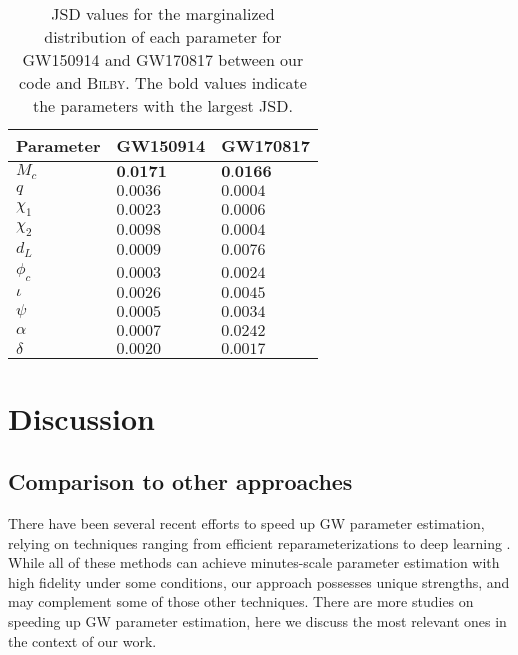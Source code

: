 \documentclass[twocolumn]{aastex631}
\begin{document}
\begin{table}[hbt!]
    \begin{center}
    \begin{tabular}{ l l l}
    \hline
    \hline
    Parameter & GW150914 & GW170817\\
    \hline
        $M_c$ & $\textbf{0.0171}$ & $\textbf{0.0166}$ \\
        $q$ & $0.0036$ & $0.0004$ \\
        $\chi_1$ & $0.0023$ & $0.0006$ \\
        $\chi_2$ & $0.0098$ & $0.0004$ \\
        $d_L$ & $0.0009$ & $0.0076$ \\
        $\phi_c$ & $0.0003$ & $0.0024$ \\
        $\iota$ & $0.0026$ & $0.0045$ \\
        $\psi$ & $0.0005$ & $0.0034$ \\
        $\alpha$ & $0.0007$ & $0.0242$ \\
        $\delta$ & $0.0020$ & $0.0017$ \\
    \hline
    \hline
    \end{tabular}
    \caption{JSD values for the marginalized distribution of each parameter for
    GW150914 and GW170817 between our code and \textsc{Bilby}. The bold values
    indicate the parameters with the largest JSD.}
    \label{tab:JSD}
    \end{center}
\end{table}

\section{Discussion}
\label{sec: Discussion}

\subsection{Comparison to other approaches}

There have been several recent efforts to speed up GW parameter estimation,
relying on techniques ranging from efficient reparameterizations
\cite{Islam:2022afg,Roulet:2022kot} to deep learning
\cite{Dax:2021tsq,Dax:2022pxd}. While all of these methods can achieve
minutes-scale parameter estimation with high fidelity under some conditions, our
approach possesses unique strengths, and may complement some of those other
techniques. There are more studies
\cite{Canizares:2014fya,Smith:2016qas,Lee:2022jpn,Wofford:2022ykb,Lange:2018pyp,Williams:2021qyt,Morisaki:2021ngj}
on speeding up GW parameter estimation, here we discuss the most relevant ones
in the context of our work.
\end{document}
